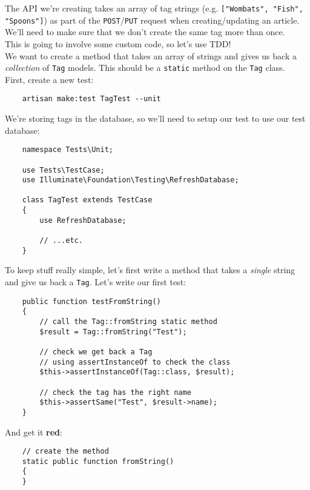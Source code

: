 The API we're creating takes an array of tag strings (e.g. \texttt{["Wombats", "Fish", "Spoons"]}) as part of the \texttt{POST}/\texttt{PUT} request when creating/updating an article. We'll need to make sure that we don't create the same tag more than once.
\\

This is going to involve some custom code, so let's use TDD!
\\

We want to create a method that takes an array of strings and gives us back a \textit{collection} of \texttt{Tag} models. This should be a \texttt{static} method on the \texttt{Tag} class.
\\

First, create a new test:

\begin{verbatim}
    artisan make:test TagTest --unit
\end{verbatim}

We're storing tags in the database, so we'll need to setup our test to use our test database:

\begin{verbatim}
    namespace Tests\Unit;

    use Tests\TestCase;
    use Illuminate\Foundation\Testing\RefreshDatabase;

    class TagTest extends TestCase
    {
        use RefreshDatabase;

        // ...etc.
    }
\end{verbatim}

To keep stuff really simple, let's first write a method that takes a \textit{single} string and give us back a \texttt{Tag}. Let's write our first test:

\begin{verbatim}
    public function testFromString()
    {
        // call the Tag::fromString static method
        $result = Tag::fromString("Test");

        // check we get back a Tag
        // using assertInstanceOf to check the class
        $this->assertInstanceOf(Tag::class, $result);

        // check the tag has the right name
        $this->assertSame("Test", $result->name);
    }
\end{verbatim}

And get it \textbf{red}:

\begin{verbatim}
    // create the method
    static public function fromString()
    {
    }
\end{verbatim}

